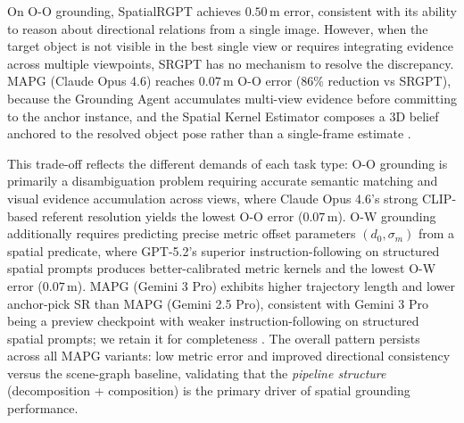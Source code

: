 On O-O grounding, SpatialRGPT achieves $0.50\,\mathrm{m}$ error, consistent with its ability to reason about directional relations from a single image. However, when the target object is not visible in the best single view or requires integrating evidence across multiple viewpoints, SRGPT has no mechanism to resolve the discrepancy. MAPG (Claude Opus 4.6) reaches $0.07\,\mathrm{m}$ O-O error (86\% reduction vs SRGPT), because the Grounding Agent accumulates multi-view evidence before committing to the anchor instance, and the Spatial Kernel Estimator composes a $3$D belief anchored to the resolved object pose rather than a single-frame estimate . 

This trade-off reflects the different demands of each task type: O-O grounding is primarily a disambiguation problem requiring accurate semantic matching and visual evidence accumulation across views, where Claude Opus 4.6’s strong CLIP-based referent resolution yields the lowest O-O error ($0.07\,\mathrm{m}$). O-W grounding additionally requires predicting precise metric offset parameters $(d_0, \sigma_m)$ from a spatial predicate, where GPT-5.2’s superior instruction-following on structured spatial prompts produces better-calibrated metric kernels and the lowest O-W error ($0.07\,\mathrm{m}$). 
MAPG (Gemini 3 Pro) exhibits higher trajectory length and lower anchor-pick SR than MAPG (Gemini 2.5 Pro), consistent with Gemini 3 Pro being a preview checkpoint with weaker instruction-following on structured spatial prompts; we retain it for completeness . The overall pattern persists across all MAPG variants: low metric error and improved directional consistency versus the scene-graph baseline, validating that the \emph{pipeline structure} (decomposition + composition) is the primary driver of spatial grounding performance. 


